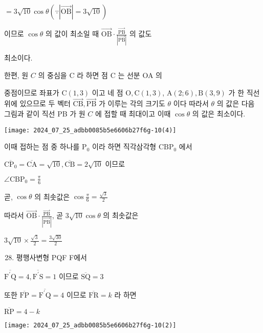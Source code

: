 \documentclass[10pt]{article}
\begin{document}
$=3 \sqrt{10} \cos \theta(\because|\overrightarrow{\mathrm{OB}}|=3 \sqrt{10})$

이므로 $\cos \theta$ 의 값이 최소일 때 $\overrightarrow{\mathrm{OB}} \cdot \frac{\overrightarrow{\mathrm{PB}}}{|\overrightarrow{\mathrm{PB}}|}$ 의 값도

최소이다.

한편, 원 $C$ 의 중심을 C 라 하면 점 C 는 선분 OA 의

중점이므로 좌표가 $\mathrm{C}(1,3)$ 이고 네 점 $\mathrm{O}, \mathrm{C}(1,3)$, $\mathrm{A}(2 ; 6), \mathrm{B}(3,9)$ 가 한 직선 위에 있으므로 두 벡터 $\overrightarrow{\mathrm{CB}}, \overrightarrow{\mathrm{PB}}$ 가 이루는 각의 크기도 $\theta$ 이다 따라서 $\theta$ 의 값은 다음 그림과 같이 직선 PB 가 원 $C$ 에 접할 때 최대이고 이때 $\cos \theta$ 의 값은 최소이다.

\begin{center}
\texttt{[image: 2024\_07\_25\_adbb0085b5e6606b27f6g-10(4)]}
\end{center}

이때 접하는 점 중 하나를 $\mathrm{P}_{0}$ 이라 하면 직각삼각형 $\mathrm{CBP}_{0}$ 에서

$\overline{\mathrm{CP}_{0}}=\overline{\mathrm{CA}}=\sqrt{10}, \overline{\mathrm{CB}}=2 \sqrt{10}$ 이므로

$\angle \mathrm{CBP}_{0}=\frac{\pi}{6}$

곧, $\cos \theta$ 의 최솟값은 $\cos \frac{\pi}{6}=\frac{\sqrt{3}}{2}$

따라서 $\overrightarrow{\mathrm{OB}} \cdot \frac{\overrightarrow{\mathrm{PB}}}{|\overrightarrow{\mathrm{PB}}|}$, 곧 $3 \sqrt{10} \cos \theta$ 의 최솟값은

$3 \sqrt{10} \times \frac{\sqrt{3}}{2}=\frac{3 \sqrt{30}}{2}$

\begin{enumerate}
  \setcounter{enumi}{27}
  \item 평행사변형 PQF F에서
\end{enumerate}

$\overline{\mathrm{F}^{\prime} \mathrm{Q}}=4, \overline{\mathrm{F}^{\prime} \mathrm{S}}=1$ 이므로 $\overline{\mathrm{SQ}}=3$

또한 $\overline{\mathrm{FP}}=\overline{\mathrm{F}^{\prime} \mathrm{Q}}=4$ 이므로 $\overline{\mathrm{FR}}=k$ 라 하면

$\overline{\mathrm{RP}}=4-k$

\begin{center}
\texttt{[image: 2024\_07\_25\_adbb0085b5e6606b27f6g-10(2)]}
\end{center}
\end{document}
